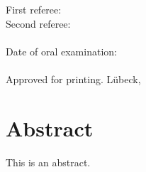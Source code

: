 \documentclass[11pt,a4paper,twoside,headsepline,titlepage,parskip=off,DIV=11,BCOR=12mm,captions=tableheading,chapterprefix=on,numbers=noenddot]{scrbook}
\begin{document}
\thispagestyle{headings}
\begin{titlepage}

\end{titlepage}

\begin{titlepage}
\addtolength{\topmargin}{18cm}
\noindent First referee:\\
Second referee:\\\\
Date of oral examination:\\\\
Approved for printing. Lübeck,
\end{titlepage}

\chapter*{Abstract}
\enlargethispage{1\baselineskip}
\setcounter{page}{1}
This is an abstract.
\end{document}
